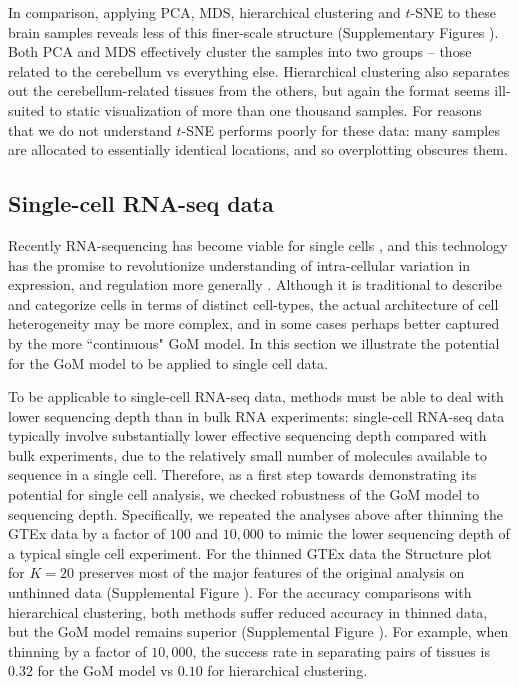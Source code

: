 \documentclass[10pt,letterpaper]{article}
\begin{document}
In comparison, applying PCA, MDS, hierarchical clustering and $t$-SNE to these brain samples reveals less of this finer-scale structure (Supplementary Figures ). Both PCA and MDS effectively cluster the samples into two groups -- those related to the cerebellum vs everything else.
Hierarchical clustering also separates out the cerebellum-related tissues from the others, but again the format seems ill-suited to static
visualization of more than one thousand samples. For reasons that we do not understand $t$-SNE performs poorly for these data: many samples are allocated to essentially identical locations, and so overplotting obscures them.


\subsection*{Single-cell RNA-seq data}

Recently RNA-sequencing has become viable for single cells \cite{Tang2009}, and this technology has the promise to revolutionize understanding of intra-cellular variation in expression, and regulation more generally \cite{Trapnell2015}. Although it is traditional to describe and categorize cells in terms of distinct cell-types,
the actual architecture of cell heterogeneity may be more complex, and in some cases perhaps better captured by the more ``continuous"  GoM model. In this section we illustrate the potential for the GoM model to be applied to single cell data.

To be applicable to single-cell RNA-seq data, methods must be able to deal with lower sequencing depth than in bulk RNA experiments:
 single-cell RNA-seq data typically involve substantially lower effective sequencing depth compared with bulk experiments, due to the relatively small number of molecules available to sequence in a single cell. Therefore, as a first step towards demonstrating its potential for single cell analysis, we checked robustness of the GoM model to sequencing depth. Specifically, we repeated the analyses above after thinning the GTEx data by a factor of $100$ and $10,000$ to mimic the lower sequencing depth of a typical single cell experiment. For the thinned GTEx data the Structure plot for $K=20$ preserves most of the major features of the original analysis on unthinned data (Supplemental Figure ). For the accuracy comparisons with hierarchical clustering, both methods suffer reduced accuracy in thinned data, but the GoM model remains superior (Supplemental Figure ). For example, when thinning by a factor of $10,000$, the success rate in separating pairs of tissues is $0.32$ for the GoM model vs $0.10$ for hierarchical clustering.
\end{document}
